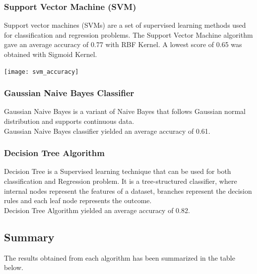 \subsubsection{Support Vector Machine (SVM)}

Support vector machines (SVMs) are a set of supervised learning methods used for classification and regression problems. The Support Vector Machine algorithm gave an average accuracy of 0.77 with RBF Kernel. A lowest score of 0.65 was obtained with Sigmoid Kernel. \\

\begin{Figure}
  \texttt{[image: svm\_accuracy]}
  \label{fig:svmkernels}
\end{Figure}

\subsubsection{Gaussian Naive Bayes Classifier}

Gaussian Naive Bayes is a variant of Naive Bayes that follows Gaussian normal distribution and supports continuous data. \\

Gaussian Naive Bayes classifier yielded an average accuracy of 0.61. 

\subsubsection{Decision Tree Algorithm}

Decision Tree is a Supervised learning technique that can be used for both classification and Regression problem. It is a tree-structured classifier, where internal nodes represent the features of a dataset, branches represent the decision rules and each leaf node represents the outcome. \\

Decision Tree Algorithm yielded an average accuracy of 0.82. 

\subsection{Summary}

The results obtained from each algorithm has been summarized in the table below.

